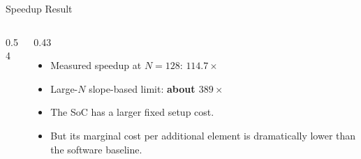 \documentclass[aspectratio=169]{beamer}
\begin{document}
\begin{frame}{Speedup Result}
\begin{columns}[T,totalwidth=\textwidth]
\begin{column}{0.54\textwidth}
\centering
{}
\end{column}
\begin{column}{0.43\textwidth}
\small
\begin{itemize}
\item Measured speedup at $N=128$: \textbf{$114.7\times$}
\item Large-$N$ slope-based limit: \textbf{about $389\times$}
\item The SoC has a larger fixed setup cost.
\item But its marginal cost per additional element is dramatically lower than the software baseline.
\end{itemize}
\end{column}
\end{columns}
\end{frame}
\end{document}
